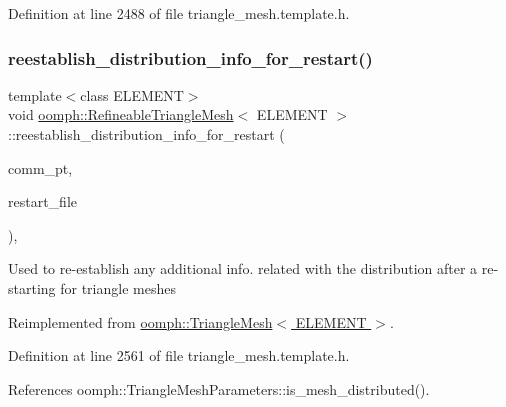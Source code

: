 Definition at line 2488 of file triangle\+\_\+mesh.\+template.\+h.

\mbox{\label{classoomph_1_1RefineableTriangleMesh_a3ecdb3b15c3fefbc96f407c4fdf5b155}} 
\subsubsection{\texorpdfstring{reestablish\+\_\+distribution\+\_\+info\+\_\+for\+\_\+restart()}{reestablish\_distribution\_info\_for\_restart()}}
{\footnotesize\ttfamily template$<$class E\+L\+E\+M\+E\+NT$>$ \\
void \hyperlink{classoomph_1_1RefineableTriangleMesh}{oomph\+::\+Refineable\+Triangle\+Mesh}$<$ E\+L\+E\+M\+E\+NT $>$\+::reestablish\+\_\+distribution\+\_\+info\+\_\+for\+\_\+restart (\begin{DoxyParamCaption}\item[{\hyperlink{classoomph_1_1OomphCommunicator}{Oomph\+Communicator} $\ast$}]{comm\+\_\+pt,  }\item[{std\+::istream \&}]{restart\+\_\+file }\end{DoxyParamCaption})\hspace{0.3cm}{\ttfamily [inline]}, {\ttfamily [virtual]}}

Used to re-\/establish any additional info. related with the distribution after a re-\/starting for triangle meshes 

Reimplemented from \hyperlink{classoomph_1_1TriangleMesh_aa4b1cfd4537c1e511fe1f2fb14b1e8a6}{oomph\+::\+Triangle\+Mesh$<$ E\+L\+E\+M\+E\+N\+T $>$}.



Definition at line 2561 of file triangle\+\_\+mesh.\+template.\+h.



References oomph\+::\+Triangle\+Mesh\+Parameters\+::is\+\_\+mesh\+\_\+distributed().

\mbox{\label{classoomph_1_1RefineableTriangleMesh_a9bd4d46e9a61131b8b8f2b68579ac972}} 
